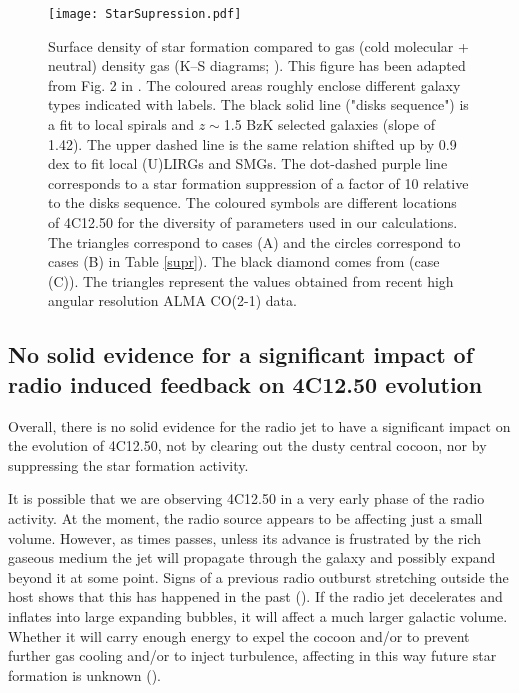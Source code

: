 \documentclass{aa}
\begin{document}
\begin{figure}
\centering
\texttt{[image: StarSupression.pdf]}
\caption{Surface density of star formation compared to gas (cold molecular + neutral)  density gas (K–S diagrams; \citealt{Kennicutt1998}). This figure has been adapted from Fig. 2 in \cite{Daddi2010a}. The coloured areas roughly enclose different galaxy types indicated with labels. The black solid line ("disks sequence") is a fit to local spirals and $z\sim$1.5 BzK selected galaxies (slope of 1.42). The upper dashed line is the same relation shifted up by 0.9 dex to fit local (U)LIRGs and SMGs.  The dot-dashed purple  line corresponds to a star formation suppression of a factor of 10 relative to the disks sequence.  The coloured symbols are different locations of 4C12.50 for the diversity of parameters  used in our calculations. The triangles correspond to  cases (A) and the circles correspond to cases  (B) in Table \ref{supr}).  The black diamond comes from \citealt{Lanz2016} (case (C)). The triangles  represent the values obtained from recent high angular resolution ALMA CO(2-1) data. }
\label{ks}
\end{figure}


\subsection{No solid evidence for a significant impact of radio induced feedback on 4C12.50 evolution}

Overall, there is no solid evidence for the radio jet to have a significant impact on the evolution of 4C12.50, not by clearing out the dusty central cocoon, nor by suppressing the star formation activity.

It is possible that we are observing 4C12.50 in a very early phase of the radio activity. 
At the moment, the radio source appears to be affecting just a small volume.   However, as   times passes, unless its advance is frustrated by the rich gaseous medium the jet will propagate through the galaxy  and possibly expand beyond it at some point.  Signs of a previous radio outburst stretching outside the host   shows that this has happened in the past (\citealt{Lister2003,Stanghellini2005}). If the radio jet decelerates and inflates into large expanding bubbles, it will affect a much larger galactic volume. Whether  it will carry enough energy to expel the cocoon and/or to prevent
further gas cooling and/or to inject turbulence, affecting in this way future star formation is unknown (\citealt{Mukherjee2016,Morganti2021}).
\end{document}
